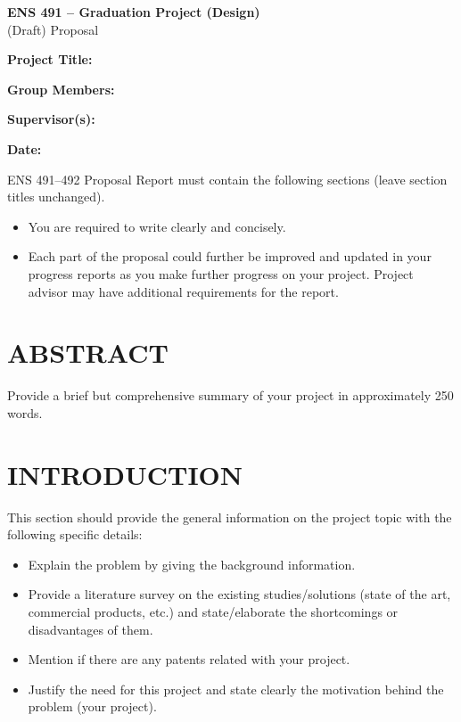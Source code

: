 \documentclass[12pt,a4paper]{article}
\begin{document}
\begin{center}
    {\LARGE \textbf{ENS 491 -- Graduation Project (Design)}}\\[1em]
    {\large (Draft) Proposal}
\end{center}

\vspace{1.5em}

\noindent \textbf{Project Title:} \hrulefill

\vspace{1em}

\noindent \textbf{Group Members:} \hrulefill

\vspace{1em}

\noindent \textbf{Supervisor(s):} \hrulefill

\vspace{1em}

\noindent \textbf{Date:} \hrulefill

\vspace{2em}

\noindent ENS 491--492 Proposal Report must contain the following sections (leave section titles unchanged).

\begin{itemize}[leftmargin=1.5em]
    \item You are required to write clearly and concisely.
    \item Each part of the proposal could further be improved and updated in your progress reports as you make further progress on your project. Project advisor may have additional requirements for the report.
\end{itemize}

\section{ABSTRACT}
Provide a brief but comprehensive summary of your project in approximately 250 words.

\section{INTRODUCTION}
This section should provide the general information on the project topic with the following specific details:

\begin{itemize}[leftmargin=1.5em]
    \item Explain the problem by giving the background information.
    \item Provide a literature survey on the existing studies/solutions (state of the art, commercial products, etc.) and state/elaborate the shortcomings or disadvantages of them.
    \item Mention if there are any patents related with your project.
    \item Justify the need for this project and state clearly the motivation behind the problem (your project).
\end{itemize}
\end{document}
